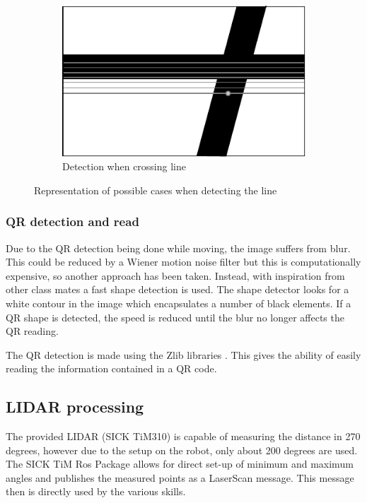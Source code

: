 \begin{figure}
\begin{subfigure}[H]{0.296\textwidth}
	            \includegraphics[width=\textwidth]{figs/mr_camera_processing_3}
	            \caption{Detection when crossing line}
	            \label{fig:mr_camera_processing_3}
	    	\end{subfigure}
	    \caption{Representation of possible cases when detecting the line}
	    \end{figure}

	\subsubsection{QR detection and read} %
	\label{ssub:qr_detection_and_read}
	Due to the QR detection being done while moving, the image suffers from blur.
	This could be reduced by a Wiener motion noise filter but this is computationally expensive, so another approach has been taken.
	Instead, with inspiration from other class mates a fast shape detection is used. The shape detector looks for a white contour in the image which encapsulates a number of black elements. If a QR shape is detected, the speed is reduced until the blur no longer affects the QR reading.

	The QR detection is made using the Zlib libraries \cite{zlib}. 
	This gives the ability of easily reading the information contained in a QR code.



	\subsection{LIDAR processing} %
	\label{sub:mr_lidar_processing}
	The provided LIDAR (SICK TiM310) is capable of measuring the distance in 270 degrees, however due to the setup on the robot, only about 200 degrees are used. The SICK TiM Ros Package \cite{sick_tim} allows for direct set-up of minimum and maximum angles and publishes the measured points as a LaserScan message. This message then is directly used by the various skills.

